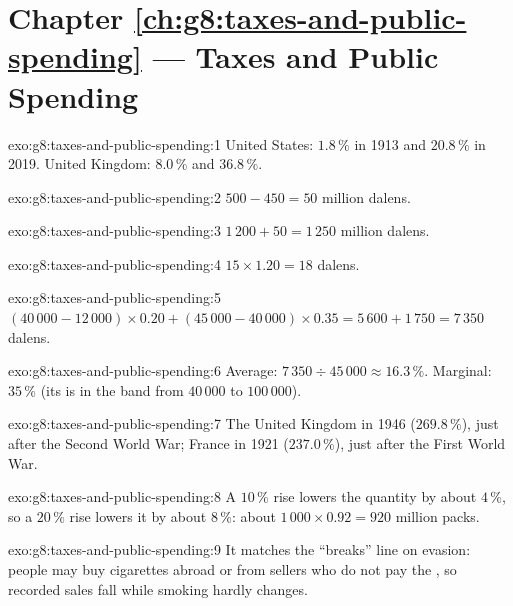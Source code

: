\section*{Chapter \ref{ch:g8:taxes-and-public-spending} --- Taxes and Public Spending}

\begin{solution}{exo:g8:taxes-and-public-spending:1}
United States: $1.8\,\%$ in 1913 and $20.8\,\%$ in 2019. United Kingdom: $8.0\,\%$ and $36.8\,\%$.
\end{solution}

\begin{solution}{exo:g8:taxes-and-public-spending:2}
$500 - 450 = 50$ million dalens.
\end{solution}

\begin{solution}{exo:g8:taxes-and-public-spending:3}
$1\,200 + 50 = 1\,250$ million dalens.
\end{solution}

\begin{solution}{exo:g8:taxes-and-public-spending:4}
$15 \times 1.20 = 18$ dalens.
\end{solution}

\begin{solution}{exo:g8:taxes-and-public-spending:5}
$(40\,000 - 12\,000) \times 0.20 + (45\,000 - 40\,000) \times 0.35 = 5\,600 + 1\,750 = 7\,350$ dalens.
\end{solution}

\begin{solution}{exo:g8:taxes-and-public-spending:6}
Average: $7\,350 \div 45\,000 \approx 16.3\,\%$. Marginal: $35\,\%$ (its  is in the band from
$40\,000$ to $100\,000$).
\end{solution}

\begin{solution}{exo:g8:taxes-and-public-spending:7}
The United Kingdom in 1946 ($269.8\,\%$), just after the Second World War; France in 1921
($237.0\,\%$), just after the First World War.
\end{solution}

\begin{solution}{exo:g8:taxes-and-public-spending:8}
A $10\,\%$  rise lowers the quantity by about $4\,\%$, so a $20\,\%$ rise lowers it by about
$8\,\%$: about $1\,000 \times 0.92 = 920$ million packs.
\end{solution}

\begin{solution}{exo:g8:taxes-and-public-spending:9}
It matches the ``breaks'' line on evasion: people may buy cigarettes abroad or from sellers who do not
pay the , so recorded sales fall while smoking hardly changes.
\end{solution}

